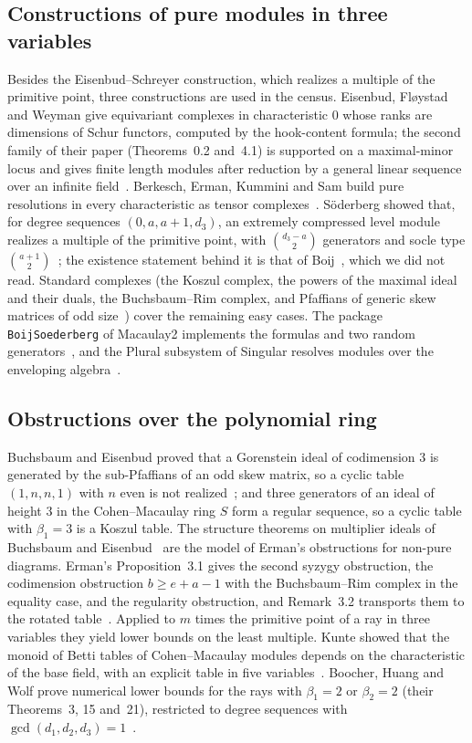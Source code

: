 \documentclass[11pt]{article}
\theoremstyle{definition}
\theoremstyle{remark}
\begin{document}
\subsection{Constructions of pure modules in three variables}

Besides the Eisenbud--Schreyer construction, which realizes a multiple of the primitive point, three constructions are used in the census. Eisenbud, Fl{\o}ystad and Weyman give equivariant complexes in characteristic $0$ whose ranks are dimensions of Schur functors, computed by the hook-content formula; the second family of their paper (Theorems~0.2 and~4.1) is supported on a maximal-minor locus and gives finite length modules after reduction by a general linear sequence over an infinite field~\cite{EFW11}. Berkesch, Erman, Kummini and Sam build pure resolutions in every characteristic as tensor complexes~\cite[Theorem~1.9]{BEKS13}. S\"oderberg showed that, for degree sequences $(0,a,a+1,d_3)$, an extremely compressed level module realizes a multiple of the primitive point, with $\binom{d_3-a}{2}$ generators and socle type $\binom{a+1}{2}$~\cite[Proposition~4.1]{SodLevel}; the existence statement behind it is that of Boij~\cite{Boij00}, which we did not read. Standard complexes (the Koszul complex, the powers of the maximal ideal and their duals, the Buchsbaum--Rim complex, and Pfaffians of generic skew matrices of odd size~\cite{BE77}) cover the remaining easy cases. The package \texttt{BoijSoederberg} of Macaulay2 implements the formulas and two random generators~\cite{M2BS}, and the Plural subsystem of Singular resolves modules over the enveloping algebra~\cite{Singular}.

\subsection{Obstructions over the polynomial ring}

Buchsbaum and Eisenbud proved that a Gorenstein ideal of codimension $3$ is generated by the sub-Pfaffians of an odd skew matrix, so a cyclic table $(1,n,n,1)$ with $n$ even is not realized~\cite{BE77}; and three generators of an ideal of height $3$ in the Cohen--Macaulay ring $S$ form a regular sequence, so a cyclic table with $\beta_1=3$ is a Koszul table. The structure theorems on multiplier ideals of Buchsbaum and Eisenbud~\cite{BE74} are the model of Erman's obstructions for non-pure diagrams. Erman's Proposition~3.1 gives the second syzygy obstruction, the codimension obstruction $b\ge e+a-1$ with the Buchsbaum--Rim complex in the equality case, and the regularity obstruction, and Remark~3.2 transports them to the rotated table~\cite{Erman09}. Applied to $m$ times the primitive point of a ray in three variables they yield lower bounds on the least multiple. Kunte showed that the monoid of Betti tables of Cohen--Macaulay modules depends on the characteristic of the base field, with an explicit table in five variables~\cite{Kunte}. Boocher, Huang and Wolf prove numerical lower bounds for the rays with $\beta_1=2$ or $\beta_2=2$ (their Theorems~3, 15 and~21), restricted to degree sequences with $\gcd(d_1,d_2,d_3)=1$~\cite{BHW}.
\end{document}
